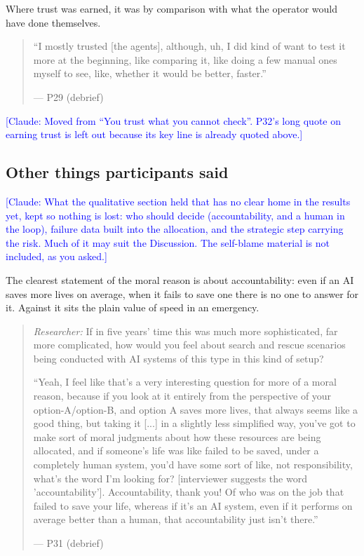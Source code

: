 \label{sec:qual:trust-unchecked:earned}
Where trust was earned, it was by comparison with what the operator would have done themselves.

\begin{quote}\small
``I mostly trusted [the agents], although, uh, I did kind of want to test it more at the beginning, like comparing it, like doing a few manual ones myself to see, like, whether it would be better, faster.''\par\hfill--- P29 (debrief)
\end{quote}
\textcolor{blue}{[Claude: Moved from ``You trust what you cannot check''. P32's long quote on earning trust is left out because its key line is already quoted above.]}



\clearpage

\subsection{Other things participants said}\label{sec:qual}\label{sec:qual:who-decides}\label{sec:qual:failure}
\textcolor{blue}{[Claude: What the qualitative section held that has no clear home in the results yet, kept so nothing is lost: who should decide (accountability, and a human in the loop), failure data built into the allocation, and the strategic step carrying the risk. Much of it may suit the Discussion. The self-blame material is not included, as you asked.]}

\label{sec:qual:who-decides:accountability}
The clearest statement of the moral reason is about accountability: even if an AI saves more lives on average, when it fails to save one there is no one to answer for it. Against it sits the plain value of speed in an emergency.

\begin{quote}\small
{\footnotesize\textit{Researcher:} If in five years' time this was much more sophisticated, far more complicated, how would you feel about search and rescue scenarios being conducted with AI systems of this type in this kind of setup?}\par\smallskip
``Yeah, I feel like that's a very interesting question for more of a moral reason, because if you look at it entirely from the perspective of your option-A/option-B, and option A saves more lives, that always seems like a good thing, but taking it [...] in a slightly less simplified way, you've got to make sort of moral judgments about how these resources are being allocated, and if someone's life was like failed to be saved, under a completely human system, you'd have some sort of like, not responsibility, what's the word I'm looking for? [interviewer suggests the word 'accountability']. Accountability, thank you! Of who was on the job that failed to save your life, whereas if it's an AI system, even if it performs on average better than a human, that accountability just isn't there.''\par\hfill--- P31 (debrief)
\end{quote}


